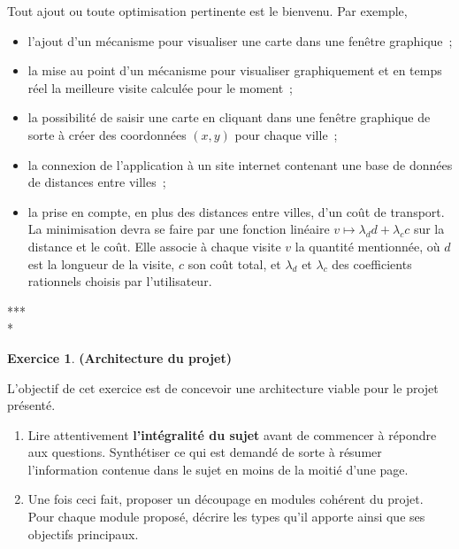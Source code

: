 \documentclass[12pt]{article}
\theoremstyle{definition}
\newtheorem{Exercice}{Exercice}
\begin{document}
Tout ajout ou toute optimisation pertinente est le bienvenu. Par exemple,
\begin{itemize}
    \item l'ajout d'un mécanisme pour visualiser une carte dans une
    fenêtre graphique~;
    \smallskip

    \item la mise au point d'un mécanisme pour visualiser graphiquement
    et en temps réel la meilleure visite calculée pour le moment~;
    \smallskip

    \item la possibilité de saisir une carte en cliquant dans une fenêtre
    graphique de sorte à créer des coordonnées $(x, y)$ pour chaque ville~;
    \smallskip

    \item la connexion de l'application à un site internet contenant une
    base de données de distances entre villes~;
    \smallskip

    \item la prise en compte, en plus des distances entre villes, d'un
    coût de transport. La minimisation devra se faire par une fonction
    linéaire $v \mapsto \lambda_d d + \lambda_c c$ sur la distance et
    le coût. Elle associe à chaque visite $v$ la quantité mentionnée,
    où $d$ est la longueur de la visite, $c$ son coût total, et
    $\lambda_d$ et $\lambda_c$ des coefficients rationnels choisis par
    l'utilisateur.
\end{itemize}

\begin{center} *** \\ * \end{center}
\bigskip
\bigskip

\begin{Exercice} {\bf (Architecture du projet)}\smallskip

L'objectif de cet exercice est de concevoir une architecture viable pour
le projet présenté.
\smallskip

\begin{enumerate}
    \item Lire attentivement {\bf l'intégralité du sujet} avant de
    commencer à répondre aux questions. Synthétiser ce qui est demandé
    de sorte à résumer l'information contenue dans le sujet en moins de
    la moitié d'une page.
    \smallskip

    \item Une fois ceci fait, proposer un découpage en modules cohérent
    du projet. Pour chaque module proposé, décrire les types qu'il
    apporte ainsi que ses objectifs principaux.
\end{enumerate}
\end{Exercice}
\bigskip
\end{document}
